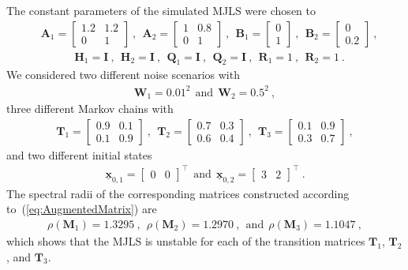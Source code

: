 \documentclass[preprint,1p,11pt]{IR-Template/ISAS_IR}
\newcommand{\rvec}[1]{\ensuremath{{\boldsymbol{\underline{#1}}}}}
\newcommand{\mat}[1]{{\ensuremath{{\mathbf{#1}}}}}
\newcommand{\tr}{^{\top}}
\newcommand{\identitymatrix}{\mat{I}}
\newcommand{\klammer}[1]{\left( #1 \right)}
\newcommand{\Asys}[1]{\mat{A}_{#1}}
\newcommand{\Bsys}[1]{\mat{B}_{#1}}
\newcommand{\Qsys}[1]{\mat{Q}_{#1}}
\newcommand{\Rsys}[1]{\mat{R}_{#1}}
\newcommand{\Hsys}[1]{\mat{H}_{#1}}
\newcommand{\xsys}[1]{\rvec{x}_{#1}}
\newcommand{\wCov}{\mat{W}}
\newcommand{\spectralradius}[1]{\rho\klammer{#1}}
\newcommand{\TransitionMatrix}[1]{\mat{T}_{#1}}
\begin{document}
The constant parameters of the simulated MJLS were chosen to
\begin{align*}
&\Asys{1} = \begin{bmatrix}1.2 & 1.2\\0& 1\end{bmatrix}\ ,\ \ 
\Asys{2} = \begin{bmatrix}1& 0.8\\0& 1\end{bmatrix}\ ,\ \ 
\Bsys{1} = \begin{bmatrix}0\\1\end{bmatrix}\ ,\ \ 
\Bsys{2} = \begin{bmatrix}0\\0.2\end{bmatrix}\ ,
\end{align*}
\begin{align*}
&\Hsys{1} = \identitymatrix\ ,\ \ 
\Hsys{2} = \identitymatrix\ ,\ \ 
\Qsys{1} = \identitymatrix\ ,\ \ 
\Qsys{2} = \identitymatrix\ ,\ \ 
\Rsys{1} = 1\ ,\ \ 
\Rsys{2} = 1\ .
\end{align*}
We considered two different noise scenarios with
\begin{align*}
\wCov_{1} = 0.01^2\ \ \text{and}\ \ \wCov_{2} = 0.5^2\ ,
\end{align*}
three different Markov chains with
\begin{align*}
\TransitionMatrix{1} = \begin{bmatrix}0.9 & 0.1\\ 0.1 & 0.9\end{bmatrix}\ ,\ \ 
\TransitionMatrix{2} = \begin{bmatrix}0.7 & 0.3\\ 0.6 & 0.4\end{bmatrix}\ ,\ \ 
\TransitionMatrix{3} = \begin{bmatrix}0.1 & 0.9\\ 0.3 & 0.7\end{bmatrix}\ ,
\end{align*}
and two different initial states
\begin{align*}
\xsys{0,1} = \begin{bmatrix}0 & 0\end{bmatrix}\tr\ \ \text{and}\ \ 
\xsys{0,2} = \begin{bmatrix}3 & 2\end{bmatrix}\tr\ .
\end{align*}
The spectral radii of the corresponding matrices constructed according to~(\ref{eq:AugmentedMatrix}) are 
\begin{align*}
\spectralradius{\mat{M}_1} = 1.3295\ ,\ \ 
\spectralradius{\mat{M}_2} = 1.2970\ ,\ \ \text{and}\ \ 
\spectralradius{\mat{M}_3} = 1.1047\ ,
\end{align*}
which shows that the MJLS is unstable for each of the transition matrices $\TransitionMatrix{1}$, $\TransitionMatrix{2}$, and $\TransitionMatrix{3}$.\\
\end{document}
